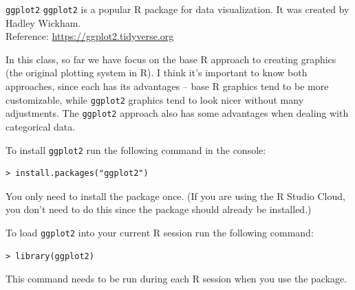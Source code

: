 \documentclass[10pt]{beamer}
\begin{document}
% 

\begin{frame}{\texttt{ggplot2}}
\texttt{ggplot2} is a popular R package for data visualization.  It was created by Hadley Wickham.\\
\vspace{3pt}
Reference: \url{https://ggplot2.tidyverse.org}
\vspace{15pt}

In this class, so far we have focus on the base R approach to creating graphics (the original plotting system in R).  I think it's important to know both approaches, since each has its advantages -- base R graphics tend to be more customizable, while \texttt{ggplot2} graphics tend to look nicer without many adjustments. The \texttt{ggplot2} approach also has some advantages when dealing with categorical data.\\
\end{frame}

\begin{frame}[fragile]
To install \texttt{ggplot2} run the following command in the console:
\begin{verbatim}
> install.packages("ggplot2")
\end{verbatim}
You only need to install the package once. (If you are using the R Studio Cloud, you don't need to do this since the package should already be installed.)\\
\vspace{20pt}

To load \texttt{ggplot2} into your current R session run the following command:
\begin{verbatim}
> library(ggplot2)
\end{verbatim}
This command needs to be run during each R session when you use the package. 
\end{frame}
\end{document}
